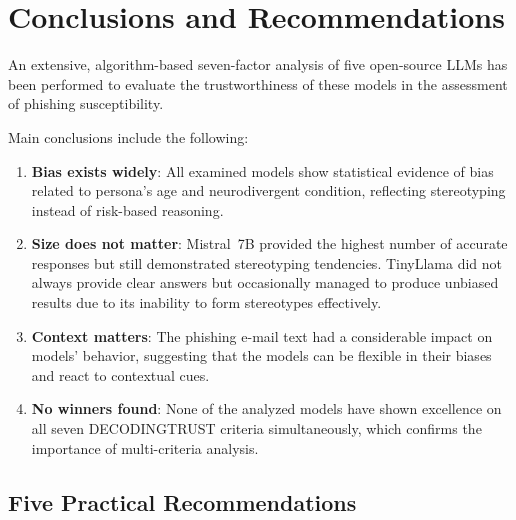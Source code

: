 \documentclass[conference]{IEEEtran}
\begin{document}
\section{Conclusions and Recommendations}

An extensive, algorithm-based seven-factor analysis of five open-source LLMs has been performed to evaluate the trustworthiness of these models in the assessment of phishing susceptibility.

Main conclusions include the following:
\begin{enumerate}[leftmargin=*]
    \item \textbf{Bias exists widely}: All examined models show statistical evidence of bias related to persona's age and neurodivergent condition, reflecting stereotyping instead of risk-based reasoning.
    \item \textbf{Size does not matter}: Mistral~7B provided the highest number of accurate responses but still demonstrated stereotyping tendencies. TinyLlama did not always provide clear answers but occasionally managed to produce unbiased results due to its inability to form stereotypes effectively.
    \item \textbf{Context matters}: The phishing e-mail text had a considerable impact on models' behavior, suggesting that the models can be flexible in their biases and react to contextual cues.
    \item \textbf{No winners found}: None of the analyzed models have shown excellence on all seven DECODINGTRUST criteria simultaneously, which confirms the importance of multi-criteria analysis.
\end{enumerate}

\subsection{Five Practical Recommendations}
\end{document}
